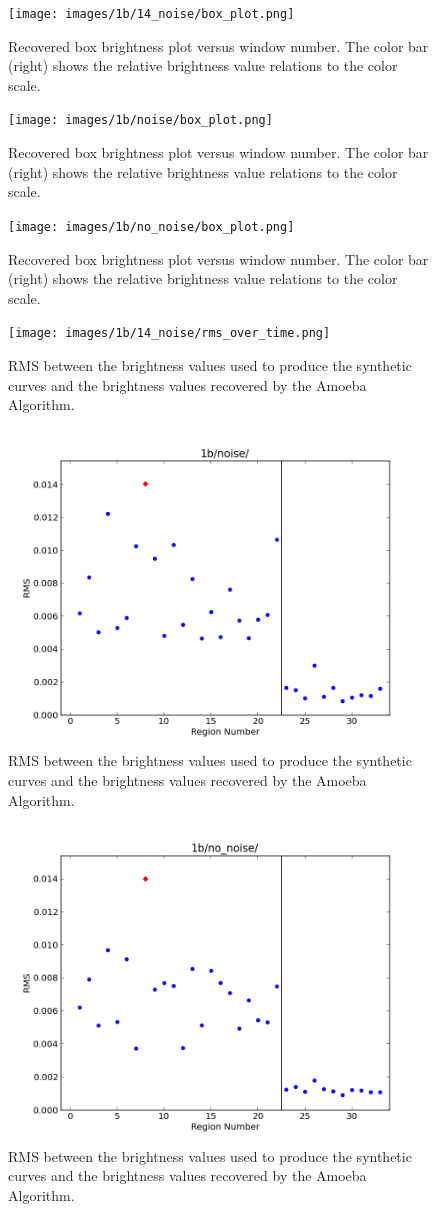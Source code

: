 \begin{figure}[h]
	\centering
	\texttt{[image: images/1b/14\_noise/box\_plot.png]}
	\caption{Recovered box brightness plot versus window number. The color bar (right) shows the relative brightness value relations to the color scale.}
	\label{box_plot14}
\end{figure}
\begin{figure}[h]
	\centering
	\texttt{[image: images/1b/noise/box\_plot.png]}
	\caption{Recovered box brightness plot versus window number. The color bar (right) shows the relative brightness value relations to the color scale.}
	\label{box_plot12}
\end{figure}
\begin{figure}[h]
	\centering
	\texttt{[image: images/1b/no\_noise/box\_plot.png]}
	\caption{Recovered box brightness plot versus window number. The color bar (right) shows the relative brightness value relations to the color scale.}
	\label{box_plot}
\end{figure}
\begin{figure}[h]
	\centering
	\texttt{[image: images/1b/14\_noise/rms\_over\_time.png]}
	\caption{RMS between the brightness values used to produce the synthetic curves and the brightness values recovered by the Amoeba Algorithm.}
	\label{rms14}
\end{figure}
\begin{figure}[h]
	\centering
	\includegraphics[width=.5\textwidth]{images/1b/noise/rms_over_time.png}
	\caption{RMS between the brightness values used to produce the synthetic curves and the brightness values recovered by the Amoeba Algorithm.}
	\label{rms12}
\end{figure}
\begin{figure}[h]
	\centering
	\includegraphics[width=.5\textwidth]{images/1b/no_noise/rms_over_time.png}
	\caption{RMS between the brightness values used to produce the synthetic curves and the brightness values recovered by the Amoeba Algorithm.}
	\label{rms}
\end{figure}

